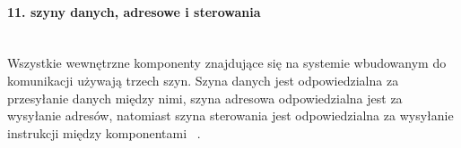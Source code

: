 \documentclass[12p]{article}
\begin{document}
\paragraph{11. szyny danych, adresowe i sterowania} \mbox{} \\

Wszystkie wewnętrzne komponenty znajdujące się na systemie wbudowanym  do komunikacji używają trzech szyn. Szyna danych jest odpowiedzialna za przesyłanie danych między nimi, szyna adresowa odpowiedzialna jest za wysyłanie adresów, natomiast szyna sterowania jest odpowiedzialna za wysyłanie instrukcji między komponentami ~\cite{es}.


\end{document}

